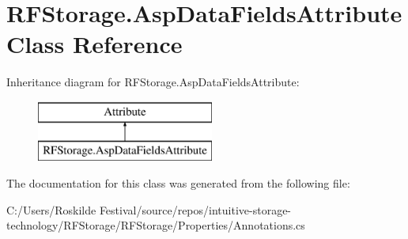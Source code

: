 \hypertarget{class_r_f_storage_1_1_asp_data_fields_attribute}{}\section{R\+F\+Storage.\+Asp\+Data\+Fields\+Attribute Class Reference}
\label{class_r_f_storage_1_1_asp_data_fields_attribute}
Inheritance diagram for R\+F\+Storage.\+Asp\+Data\+Fields\+Attribute\+:\begin{figure}[H]
\begin{center}
\leavevmode
\includegraphics[height=2.000000cm]{class_r_f_storage_1_1_asp_data_fields_attribute}
\end{center}
\end{figure}


The documentation for this class was generated from the following file\+:\begin{DoxyCompactItemize}
\item 
C\+:/\+Users/\+Roskilde Festival/source/repos/intuitive-\/storage-\/technology/\+R\+F\+Storage/\+R\+F\+Storage/\+Properties/Annotations.\+cs\end{DoxyCompactItemize}
